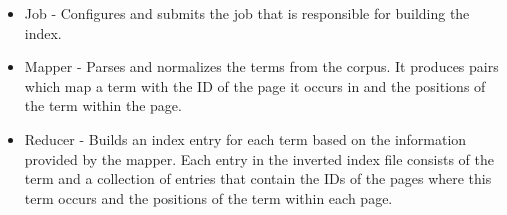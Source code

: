 \documentclass[a4paper, notitlepage]{report}
\begin{document}
\begin{itemize}
	\item Job - Configures and submits the job that is responsible for building the index.
	\item Mapper - Parses and normalizes the terms from the corpus. It produces pairs which map a term with the ID of the page it occurs in and the positions of the term within the page.
	\item Reducer - Builds an index entry for each term based on the information provided by the mapper. Each entry in the inverted index file consists of the term and a collection of entries that contain the IDs of the pages where this term occurs and the positions of the term within each page.  
\end{itemize}
\end{document}
